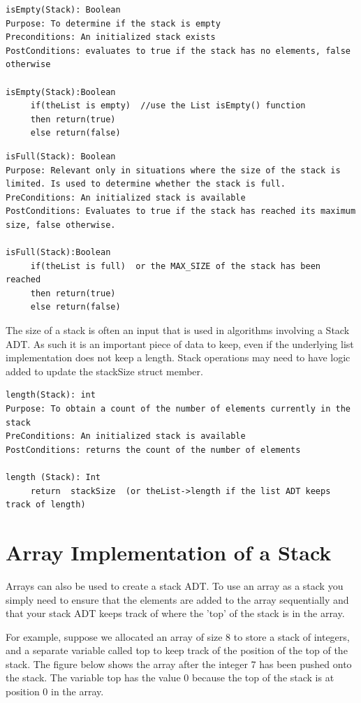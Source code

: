 \begin{lstlisting}
isEmpty(Stack): Boolean
Purpose: To determine if the stack is empty
Preconditions: An initialized stack exists
PostConditions: evaluates to true if the stack has no elements, false otherwise

isEmpty(Stack):Boolean
     if(theList is empty)  //use the List isEmpty() function
     then return(true)
     else return(false)
\end{lstlisting}




\begin{lstlisting}
isFull(Stack): Boolean
Purpose: Relevant only in situations where the size of the stack is limited. Is used to determine whether the stack is full.
PreConditions: An initialized stack is available
PostConditions: Evaluates to true if the stack has reached its maximum size, false otherwise.

isFull(Stack):Boolean
     if(theList is full)  or the MAX_SIZE of the stack has been reached
     then return(true)
     else return(false)
\end{lstlisting}


The size of a stack is often an input that is used in algorithms involving a Stack ADT.  As such it is an important piece of data to keep, even if the underlying list implementation does not keep a length.   Stack operations may need to have logic added to update the stackSize struct member.

\begin{lstlisting}
length(Stack): int
Purpose: To obtain a count of the number of elements currently in the stack
PreConditions: An initialized stack is available
PostConditions: returns the count of the number of elements

length (Stack): Int
     return  stackSize  (or theList->length if the list ADT keeps track of length)
\end{lstlisting}



\section{Array Implementation of a Stack}
    Arrays can also be used to create a stack ADT. To use an array as a stack you simply need to ensure that the elements are added to the array sequentially and that your stack ADT keeps track of where the 'top' of the stack is in the array. 
    
 For example, suppose we allocated an array of size 8 to store a stack of
 integers, and a separate variable called top to keep track of the position of the top of the stack. The figure below shows the array after the integer 7 has been pushed onto the stack. The variable top has the value 0 because
    the top of the stack is at position 0 in the array.

